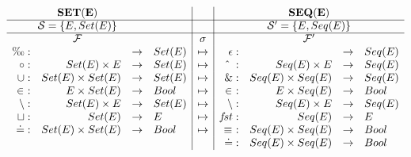 \begin{figure}[hbt] \centering
\( \begin{array}{rrcl|c|rrcl}
\multicolumn{3}{c}{{\bf SET(E)}} & & &
\multicolumn{4}{c}{{\bf SEQ(E)}} \\ \cline{1-9} \multicolumn{3}{c}{\Sorts=\{E,Set(E)\}} & & & 
\multicolumn{4}{c}{\Sorts'=\{E,Seq(E)\}} \\ \cline{1-9} \multicolumn{3}{c}{\Funcs} & & \sigma & \multicolumn{4}{c}{\Funcs'} \\ \es:& &\into& Set(E) & \Seq &	\epsilon:& &\into & Seq(E)\\
\ap :&Set(E)\times E&\into &Set(E) & \Seq & \lap\ :& Seq(E)\times E& \into & Seq(E)\\
\cup: & Set(E)\times Set(E) & \into & Set(E) & \Seq & \&: & Seq(E)\times Seq(E)
& \into & Seq(E) \\
\in\ : & E\times Set(E) & \into & Bool & \Seq & \in\ : & E\times Seq(E) & \into & Bool \\
\setminus : & Set(E)\times E & \into & Set(E) & \Seq & \setminus : & Seq(E)\times E & \into & Seq(E) \\
\ch: & Set(E) & \into & E & \Seq &	\fst: & Seq(E) & \into & E\\
\Eq: & Set(E)\times Set(E) & \into & Bool& \Seq & 
\equiv\ : & Seq(E)\times Seq(E) & \into & Bool\\
& & & &	&	\Eq : & Seq(E)\times Seq(E) & \into & Bool
\end{array} \)


\end{figure}
